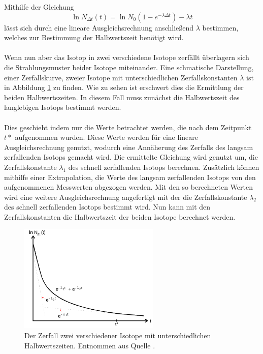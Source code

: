 Mithilfe der Gleichung 
\begin{equation}
    \ln{N_{\Delta t}(t)}=\ln N_0 (1-e^{-\lambda \Delta t}) -\lambda t
    \label{eqn:labmda}
\end{equation}
lässt sich durch eine lineare Ausgleichsrechnung anschließend $\lambda$ bestimmen, welches zur Bestimmung der Halbwertszeit benötigt wird.
\\\\
Wenn nun aber das Isotop in zwei verschiedene Isotope zerfällt überlagern sich die Strahlungsmuster beider Isotope miteinander.
Eine schmatische Darstellung, einer Zerfallskurve, zweier Isotope mit unterschiedlichen Zerfallskonstanten $\lambda$ ist in Abbildung \ref{fig:zerfall2} zu finden.
Wie zu sehen ist erschwert dies die Ermittlung der beiden Halbwertszeiten.
In diesem Fall muss zunächst die Halbwertszeit des langlebigen Isotops bestimmt werden.
\\\\
Dies geschieht indem nur die Werte betrachtet werden, die nach dem Zeitpunkt $t*$ aufgenommen wurden.
Diese Werte werden für eine lineare Ausgleichsrechnung genutzt, wodurch eine Annäherung des Zerfalls des langsam zerfallenden Isotops gemacht wird.
Die ermittelte Gleichung wird genutzt um, die Zerfallskonstante $\lambda_1$ des schnell zerfallenden Isotops berechnen.
Zusätzlich können mithilfe einer Extrapolation, die Werte des langsam zerfallenden Isotops von den aufgenommenen Messwerten abgezogen werden.
Mit den so berechneten Werten wird eine weitere Ausgleichsrechnung angefertigt mit der die Zerfallskonstante $\lambda_2$ des schnell zerfallenden Isotops bestimmt wird.
Nun kann mit den Zerfallskonstanten die Halbwertszeit der beiden Isotope berechnet werden.

\begin{figure}
    \centering
    \includegraphics[width=0.6\textwidth]{content/data/zerfall.png}
    \caption{Der Zerfall zwei verschiedener Isotope mit unterschiedlichen Halbwertszeiten. Entnommen aus Quelle \cite{anleitung}.}
    \label{fig:zerfall2}
\end{figure}